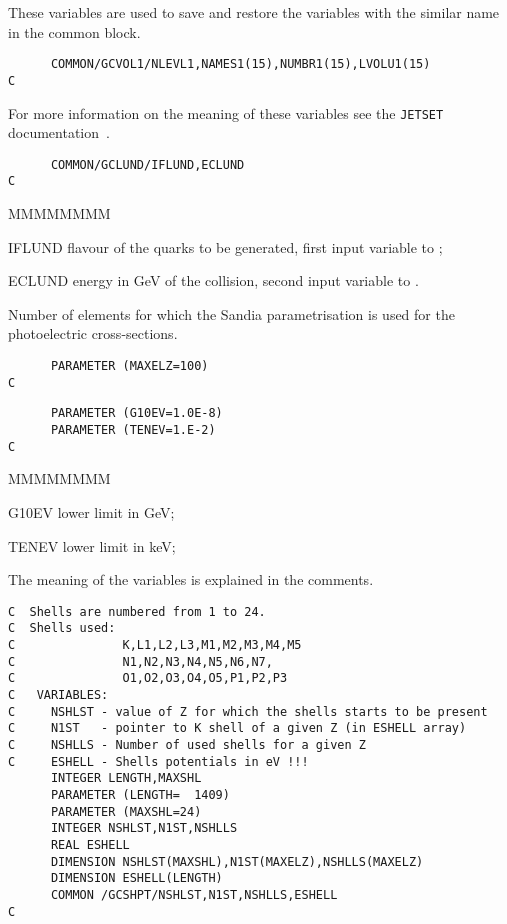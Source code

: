 These variables are used to save and restore the variables with the
similar name in the  common block.
\begin{verbatim}
      COMMON/GCVOL1/NLEVL1,NAMES1(15),NUMBR1(15),LVOLU1(15)
C
\end{verbatim}
For more information on the meaning of these variables see the
{\tt JETSET} documentation~\cite{bib-JETS}.

\begin{verbatim}
      COMMON/GCLUND/IFLUND,ECLUND
C
\end{verbatim}
\begin{DLtt}{MMMMMMMM}
\item[IFLUND] flavour of the quarks to be generated, first input variable
to ;
\item[ECLUND] energy in GeV of the \Pem\Pep collision, second input 
variable to .
\end{DLtt}

Number of elements for which the Sandia parametrisation is used for
the photoelectric cross-sections.
\begin{verbatim}
      PARAMETER (MAXELZ=100)
C
\end{verbatim}

\begin{verbatim}
      PARAMETER (G10EV=1.0E-8)
      PARAMETER (TENEV=1.E-2)
C
\end{verbatim}
\begin{DLtt}{MMMMMMMM}
\item[G10EV] lower limit in GeV;
\item[TENEV] lower limit in keV;
\end{DLtt}

The meaning of the variables is explained in the comments.
\begin{verbatim}
C  Shells are numbered from 1 to 24.
C  Shells used:
C               K,L1,L2,L3,M1,M2,M3,M4,M5
C               N1,N2,N3,N4,N5,N6,N7,
C               O1,O2,O3,O4,O5,P1,P2,P3
C   VARIABLES:
C     NSHLST - value of Z for which the shells starts to be present
C     N1ST   - pointer to K shell of a given Z (in ESHELL array)
C     NSHLLS - Number of used shells for a given Z
C     ESHELL - Shells potentials in eV !!!
      INTEGER LENGTH,MAXSHL
      PARAMETER (LENGTH=  1409)
      PARAMETER (MAXSHL=24)
      INTEGER NSHLST,N1ST,NSHLLS
      REAL ESHELL
      DIMENSION NSHLST(MAXSHL),N1ST(MAXELZ),NSHLLS(MAXELZ)
      DIMENSION ESHELL(LENGTH)
      COMMON /GCSHPT/NSHLST,N1ST,NSHLLS,ESHELL
C
\end{verbatim}

